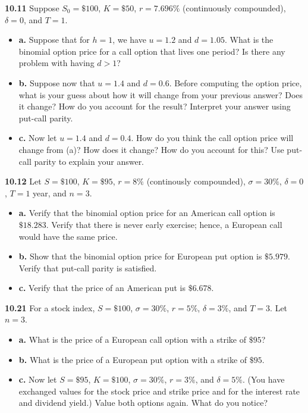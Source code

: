 \documentclass[
  letterpaper,
  DIV=11,
  numbers=noendperiod]{scrartcl}
\begin{document}
\textbf{10.11} Suppose \(S_{0} = \$100\), \(K = \$50\), \(r = 7.696\%\)
(continuously compounded), \(\delta = 0\), and \(T = 1\).

\begin{itemize}
\item
  \textbf{a.} Suppose that for \(h = 1\), we have \(u = 1.2\) and
  \(d = 1.05\). What is the binomial option price for a call option that
  lives one period? Is there any problem with having \(d > 1\)?
\item
  \textbf{b.} Suppose now that \(u = 1.4\) and \(d = 0.6\). Before
  computing the option price, what is your guess about how it will
  change from your previous answer? Does it change? How do you account
  for the result? Interpret your answer using put-call parity.
\item
  \textbf{c.} Now let \(u = 1.4\) and \(d = 0.4\). How do you think the
  call option price will change from (a)? How does it change? How do you
  account for this? Use put-call parity to explain your answer.
\end{itemize}

\textbf{10.12} Let \(S = \$100\), \(K = \$95\), \(r = 8\%\) (continously
compounded), \(\sigma = 30\%\), \(\delta = 0\), \(T = 1\) year, and
\(n = 3\).

\begin{itemize}
\item
  \textbf{a.} Verify that the binomial option price for an American call
  option is \(\$18.283\). Verify that there is never early exercise;
  hence, a European call would have the same price.
\item
  \textbf{b.} Show that the binomial option price for European put
  option is \(\$5.979\). Verify that put-call parity is satisfied.
\item
  \textbf{c.} Verify that the price of an American put is \(\$6.678\).
\end{itemize}

\textbf{10.21} For a stock index, \(S = \$100\), \(\sigma = 30\%\),
\(r = 5\%\), \(\delta = 3\%\), and \(T = 3\). Let \(n = 3\).

\begin{itemize}
\item
  \textbf{a.} What is the price of a European call option with a strike
  of \(\$95\)?
\item
  \textbf{b.} What is the price of a European put option with a strike
  of \(\$95\).
\item
  \textbf{c.} Now let \(S = \$95\), \(K = \$100\), \(\sigma = 30\%\),
  \(r = 3\%\), and \(\delta = 5\%\). (You have exchanged values for the
  stock price and strike price and for the interest rate and dividend
  yield.) Value both options again. What do you notice?
\end{itemize}
\end{document}
